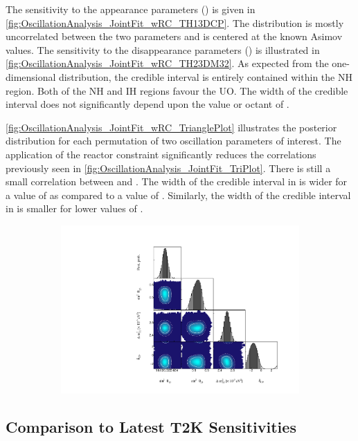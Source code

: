 The sensitivity to the appearance parameters () is given in \autoref{fig:OscillationAnalysis_JointFit_wRC_TH13DCP}. The distribution is mostly uncorrelated between the two parameters and is centered at the known Asimov values. The sensitivity to the disappearance parameters () is illustrated in \autoref{fig:OscillationAnalysis_JointFit_wRC_TH23DM32}. As expected from the one-dimensional distribution, the \quickmath{1\sigma} credible interval is entirely contained within the NH region. Both of the NH and IH regions favour the UO. The width of the  \quickmath{1\sigma} credible interval does not significantly depend upon the value or octant of .

\autoref{fig:OscillationAnalysis_JointFit_wRC_TrianglePlot} illustrates the posterior distribution for each permutation of two oscillation parameters of interest. The application of the reactor constraint significantly reduces the correlations previously seen in \autoref{fig:OscillationAnalysis_JointFit_TriPlot}. There is still a small correlation between \dcp and \delmsqatm. The width of the \quickmath{1\sigma} credible interval in \delmsqatm is wider for a value of  as compared to a value of . Similarly, the width of the \quickmath{1\sigma} credible interval in \dcp is smaller for lower values of \sinsqatm.

\begin{figure}[h]
  \begin{subfigure}[t]{1.0\textwidth}
    \includegraphics[width=\textwidth, trim={0mm 0mm 0mm 0mm}, clip,page=1]{Figures/OA/JointFit_wRC/Contours_1D_wRC_UnSmeared_CredibleInterval_TrianglePlot.pdf}
  \end{subfigure}
  \caption{}
  \label{fig:OscillationAnalysis_JointFit_wRC_TrianglePlot}
\end{figure}

\clearpage
\subsection{Comparison to Latest T2K Sensitivities}

